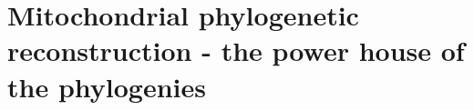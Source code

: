 \section[Mitochondrial phylogenetic reconstruction]{Mitochondrial phylogenetic reconstruction - the power house of the phylogenies}
\label{cascade-sec:mitochondria}